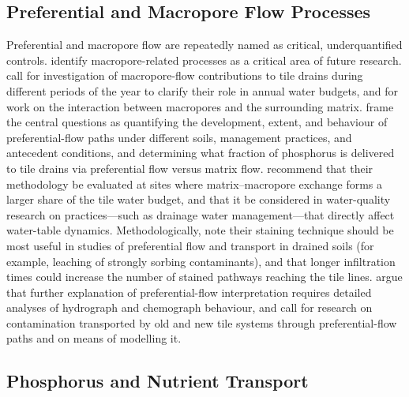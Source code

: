 \documentclass[11pt]{article}
\begin{document}
\subsection{Preferential and Macropore Flow Processes}

Preferential and macropore flow are repeatedly named as critical, underquantified controls. \textcite{Boles2015} identify macropore-related processes as a critical area of future research. \textcite{Williams2016} call for investigation of macropore-flow contributions to tile drains during different periods of the year to clarify their role in annual water budgets, and for work on the interaction between macropores and the surrounding matrix. \textcite{King2015} frame the central questions as quantifying the development, extent, and behaviour of preferential-flow paths under different soils, management practices, and antecedent conditions, and determining what fraction of phosphorus is delivered to tile drains via preferential flow versus matrix flow. \textcite{Nazari2021} recommend that their methodology be evaluated at sites where matrix--macropore exchange forms a larger share of the tile water budget, and that it be considered in water-quality research on practices---such as drainage water management---that directly affect water-table dynamics. Methodologically, \textcite{Nielsen2015} note their staining technique should be most useful in studies of preferential flow and transport in drained soils (for example, leaching of strongly sorbing contaminants), and that longer infiltration times could increase the number of stained pathways reaching the tile lines. \textcite{Ruark2009} argue that further explanation of preferential-flow interpretation requires detailed analyses of hydrograph and chemograph behaviour, and \textcite{BACKLUND1995} call for research on contamination transported by old and new tile systems through preferential-flow paths and on means of modelling it.

\subsection{Phosphorus and Nutrient Transport}
\end{document}
